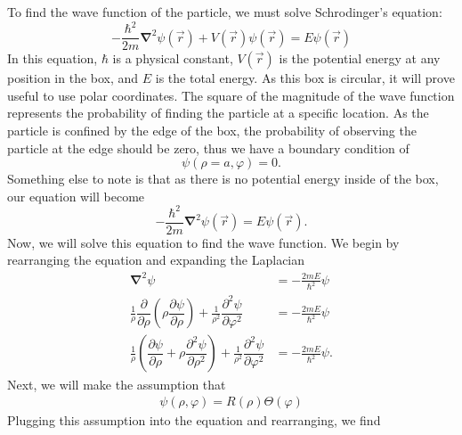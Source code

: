 \documentclass[11pt]{report}
\newcommand{\fdel}[2]{\dfrac{\partial{#1}}{\partial {#2}}} %
\newcommand{\sdel}[2]{\dfrac{\partial^2{#1}}{\partial{#2}^2}} %
\newcommand{\fpar}[1]{\left({#1}\right)}
\newcommand{\del}{\pmb{\nabla}}
\begin{document}
To find the wave function of the particle, we must solve Schrodinger's equation:
    \begin{equation*}
        -\frac{\hbar^2}{2m}\del^2\psi\fpar{\vec{r}}+V\fpar{\vec{r}}\psi\fpar{\vec{r}}=E\psi\fpar{\vec{r}}
    \end{equation*}
In this equation, $\hbar$ is a physical constant, $V\fpar{\vec{r}}$ is the potential energy at any position in the box, and $E$ is the total energy. As this box is circular, it will prove useful to use polar coordinates. The square of the magnitude of the wave function represents the probability of finding the particle at a specific location. As the particle is confined by the edge of the box, the probability of observing the particle at the edge should be zero, thus we have a boundary condition of
    \begin{equation*}
        \psi\fpar{\rho=a,\varphi} = 0.
    \end{equation*}
Something else to note is that as there is no potential energy inside of the box, our equation will become
\begin{equation*}
        -\frac{\hbar^2}{2m}\del^2\psi\fpar{\vec{r}}=E\psi\fpar{\vec{r}}.
    \end{equation*}
Now, we will solve this equation to find the wave function. We begin by rearranging the equation and expanding the Laplacian
\begin{align*}
    \del^2\psi &= -\frac{2mE}{\hbar^2}\psi\\
    \frac{1}{\rho}\fdel{}{\rho}\fpar{\rho\fdel{\psi}{\rho}}+\frac{1}{\rho^2}\sdel{\psi}{\varphi}  &= -\frac{2mE}{\hbar^2}\psi\\
    \frac{1}{\rho}\fpar{\fdel{\psi}{\rho}+\rho\sdel{\psi}{\rho}}+\frac{1}{\rho^2}\sdel{\psi}{\varphi}  &= -\frac{2mE}{\hbar^2}\psi.
\end{align*}
    Next, we will make the assumption that
        \begin{align*}
            \psi\fpar{\rho,\varphi} = R(\rho)\Theta\fpar{\varphi}
        \end{align*}
Plugging this assumption into the equation and rearranging, we find
\end{document}
